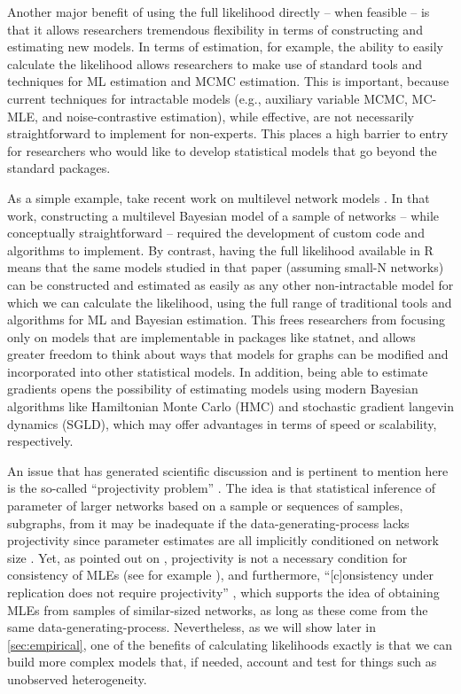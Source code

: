 \documentclass[review, nonatbib,doubleblind]{elsarticle/elsarticle}
\begin{document}
Another major benefit of using the full likelihood directly -- when feasible -- is that it allows researchers tremendous flexibility in terms of constructing and estimating new models. In terms of estimation, for example, the ability to easily calculate the likelihood allows researchers to make use of standard tools and techniques for ML estimation and MCMC estimation. This is important, because current techniques for intractable models (e.g., auxiliary variable MCMC, MC-MLE, and noise-contrastive estimation), while effective, are not necessarily straightforward to implement for non-experts. This places a high barrier to entry for researchers who would like to develop statistical models that go beyond the standard packages. 

As a simple example, take recent work on multilevel network models \cite{slaughter2016multilevel}. In that work, constructing a multilevel Bayesian model of a sample of networks -- while conceptually straightforward -- required the development of custom code and algorithms to implement. By contrast, having the full likelihood available in R means that the same models studied in that paper (assuming small-N networks) can be constructed and estimated as easily as any other non-intractable model for which we can calculate the likelihood, using the full range of traditional tools and algorithms for ML and Bayesian estimation. This frees researchers from focusing only on models that are implementable in packages like statnet, and allows greater freedom to think about ways that models for graphs can be modified and incorporated into other statistical models. In addition, being able to estimate gradients opens the possibility of estimating models using modern Bayesian algorithms like Hamiltonian Monte Carlo (HMC) and stochastic gradient langevin dynamics (SGLD), which may offer advantages in terms of speed or scalability, respectively.

An issue that has generated scientific discussion and is pertinent to mention here is the so-called ``projectivity problem'' \cite{shalizi2013}. The idea is that statistical inference of parameter of larger networks based on a sample or sequences of samples, subgraphs, from it may be inadequate if the data-generating-process lacks projectivity since parameter estimates are all implicitly conditioned on network size \cite[see]{shalizi2013}. Yet, as pointed out on \cite{schweinberger2017note}, projectivity is not a necessary condition for consistency of MLEs (see for example \cite{Krivitsky2011,Krivitsky2015}), and furthermore, ``[c]onsistency under replication does not require projectivity'' \cite[p. 4]{schweinberger2017note}, which supports the idea of obtaining MLEs from samples of similar-sized networks, as long as these come from the same data-generating-process. Nevertheless, as we will show later in \autoref{sec:empirical}, one of the benefits of calculating likelihoods exactly is that we can build more complex models that, if needed, account and test for things such as unobserved heterogeneity.
\end{document}
